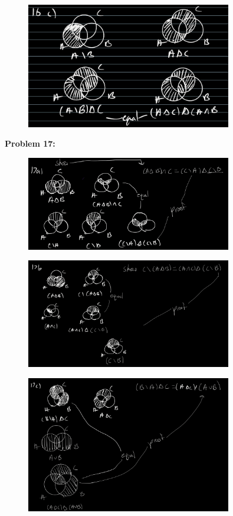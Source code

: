 \begin{figure}[H]
    \centering
    \includegraphics[width=0.8\textwidth]{images/1.2/27.PNG}
\end{figure}

\textbf{Problem 17:}
\begin{figure}[H]
    \centering
    \includegraphics[width=0.8\textwidth]{images/1.2/28.PNG}
\end{figure}
\begin{figure}[H]
    \centering
    \includegraphics[width=0.8\textwidth]{images/1.2/29.PNG}
\end{figure}
\begin{figure}[H]
    \centering
    \includegraphics[width=0.8\textwidth]{images/1.2/30.PNG}
\end{figure}


